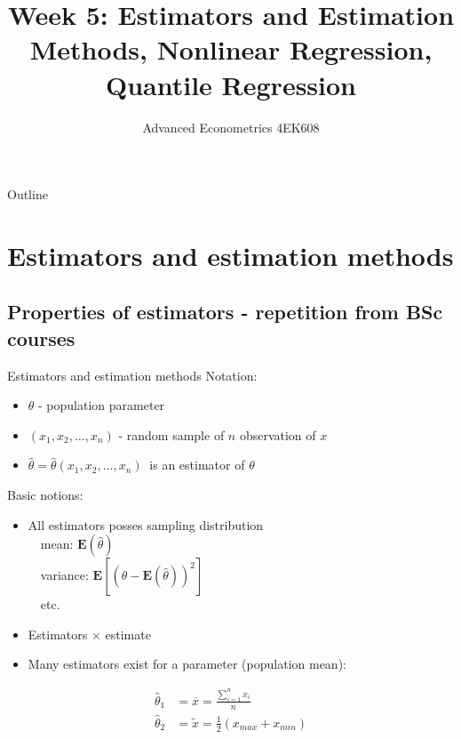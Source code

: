 \documentclass{beamer}
\title[Week1]{Week 5: Estimators and Estimation
Methods, Nonlinear Regression, Quantile Regression}
\author{Advanced Econometrics 4EK608}
\institute{Vysoká škola ekonomická v Praze}
\date{}
\begin{document}
 
\begin{frame}
  \titlepage
\end{frame}

\begin{frame}{Outline}
  \tableofcontents
\end{frame}

\section{Estimators and estimation methods}
\subsection{Properties of estimators - repetition from BSc courses}
\begin{frame}{Estimators and estimation methods}
Notation:
\begin{itemize}
\item $\theta$ - population parameter
\item $(x_1,x_2,\dots,x_n)$ - random sample of $n$ observation of $x$
\item $\hat{\theta}= \hat{\theta}(x_1,x_2,\dots,x_n) ~$ is an estimator of $\theta$
\end{itemize}
Basic notions: 
\begin{itemize}
\item All estimators posses sampling distribution\\
~~mean: $\mathbf{E}(\hat{\theta})$\\
~~variance: $\mathbf{E}[(\hat{\theta}-\mathbf{E}(\hat{\theta}))^2]$\\
~~etc.
\item Estimators $\times$ estimate 
\item Many estimators exist for a parameter (population mean):
\end{itemize}
\begin{align*}
\hat{\theta}_1 & = \overline{x} = \frac{\sum_{i=1}^nx_i}{n}\\
\hat{\theta}_2 & = \tilde{x} = \frac{1}{2}(x_{max} +x_{min})
\end{align*}
\end{frame}
\end{document}
